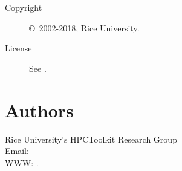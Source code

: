 \documentclass[english]{article}
\begin{document}
\begin{description}
\item[Copyright] \copyright\ 2002-2018, Rice University.
\item[License] See .
\end{description}

\section{Authors}

\noindent
Rice University's HPCToolkit Research Group \\
Email:  \\
WWW: .

\LatexManEnd
\end{document}
